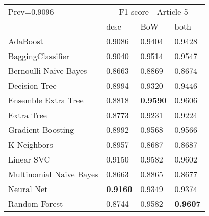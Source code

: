 \begin{tabular}{|l|l|l|l| }
\hline
Prev=0.9096 &  \multicolumn{3}{c|}{F1 score - Article 5} \\
\cline{2-4} & desc & BoW & both \\ \hline
AdaBoost                & 0.9086 & 0.9404 & 0.9428\\
BaggingClassifier       & 0.9040 & 0.9514 & 0.9547\\
Bernoulli Naive Bayes   & 0.8663 & 0.8869 & 0.8674\\
Decision Tree           & 0.8994 & 0.9320 & 0.9446\\
Ensemble Extra Tree     & 0.8818 & {\bf 0.9590} & 0.9606\\
Extra Tree              & 0.8773 & 0.9231 & 0.9224\\
Gradient Boosting       & 0.8992 & 0.9568 & 0.9566\\
K-Neighbors             & 0.8957 & 0.8687 & 0.8687\\
Linear SVC              & 0.9150 & 0.9582 & 0.9602\\
Multinomial Naive Bayes & 0.8663 & 0.8865 & 0.8677\\
Neural Net              & {\bf 0.9160} & 0.9349 & 0.9374\\
Random Forest           & 0.8744 & 0.9582 & {\bf 0.9607}\\
\hline
\end{tabular}